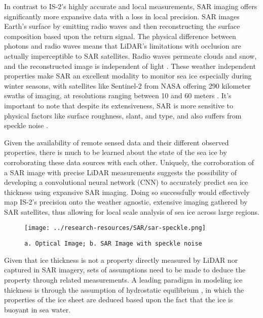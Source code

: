 In contrast to IS-2's highly accurate and local measurements, SAR imaging offers significantly more expansive data with a loss in local precision. SAR images Earth's surface by emitting radio waves and then reconstructing the surface composition based upon the return signal. The physical difference between photons and radio waves means that LiDAR's limitations with occlusion are actually imperceptible to SAR satellites. Radio waves permeate clouds and snow, and the reconstructed image is independent of light \cite{SAR-Info}. These weather independent properties make SAR an excellent modality to monitor sea ice especially during winter seasons, with satellites like Sentinel-2 from NASA offering 290 kilometer swaths of imaging, at resolutions ranging between 10 and 60 meters \cite{Sentinel-2-Availability}. It's important to note that despite its extensiveness, SAR is more sensitive to physical factors like surface roughness, slant, and type, and also suffers from speckle noise \cite{SAR-Info}. 

\indent Given the availability of remote sensed data and their different observed properties, there is much to be learned about the state of the sea ice by corroborating these data sources with each other. Uniquely, the corroboration of a SAR image with precise LiDAR measurements suggests the possibility of developing a convolutional neural network (CNN) to accurately predict sea ice thickness using expansive SAR imaging. Doing so successfully would effectively map IS-2's precision onto the weather agnostic, extensive imaging gathered by SAR satellites, thus allowing for local scale analysis of sea ice across large regions.

\begin{figure}
	\hfill\begin{minipage}{.5\textwidth}\centering
	 \texttt{[image: ../research-resources/SAR/sar-speckle.png]}
	 \caption{\texttt{a. Optical Image; b. SAR Image with speckle noise}}
	\end{minipage}
 \end{figure}


\indent Given that ice thickness is not a property directly measured by LiDAR nor captured in SAR imagery, sets of assumptions need to be made to deduce the property through related measurements. A leading paradigm in modeling ice thickness is through the assumption of hydrostatic equilibrium \cite{ICESat-2-L4-Product} \cite{Hutchings_Heil_Lecomte_Stevens_Steer_Lieser_2015} \cite{Forsström_Gerland_Pedersen_2011}, in which the properties of the ice sheet are deduced based upon the fact that the ice is buoyant in sea water.

